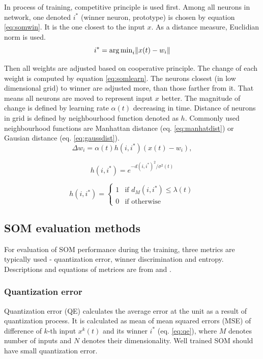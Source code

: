 In process of training, competitive principle is used first. Among all neurons in network, one denoted $i^*$ (winner neuron, prototype) is chosen by equation \ref{eq:somwin}. It is the one closest to the input $x$. As a distance measure, Euclidian norm is used.
\begin{equation}
	\label{eq:somwin}
	i^* = {\operatorname*{arg\,min}}_i \|{x}(t)-{w}_i\|
\end{equation}

Then all weights are adjusted based on cooperative principle. The change of each weight is computed by equation \ref{eq:somlearn}. The neurons closest (in low dimensional grid) to winner are adjusted more, than those farther from it. That means all neurons are moved to  represent input $x$ better. The magnitude of change is defined by learning rate $\alpha(t)$ decreasing in time. Distance of neurons in grid is defined by neighbourhood function denoted as $h$. Commonly used neighbourhood functions are Manhattan distance (eq. \ref{eq:manhatdist}) or Gausian distance (eq. \ref{eq:gaussdist}). 
\begin{equation}
	\label{eq:somlearn}
	\Delta{w}_i = \alpha(t) h(i,i^*) ({x}(t)-{w}_i),
\end{equation}


\begin{equation}
	\label{eq:gaussdist}
	h(i,i^*) = e^{-d(i,i^*)^2/{\sigma}^2(t)}
\end{equation}

\begin{equation}
	\label{eq:manhatdist}
	h(i,i^*) = \begin{cases}
		1  & \mbox{if } d_M(i,i^*)\le{\lambda}(t) \\
		0  & \mbox{if } \text{otherwise}%
	\end{cases}
\end{equation}

\subsection{SOM evaluation methods}
For evaluation of SOM performance during the training, three metrics are typically used - quantization error, winner discrimination and entropy. Descriptions and equations of metrices are from \cite{rebrova2013} and \cite{vanco2010-som}.

\subsubsection{Quantization error}
Quantization error (QE) calculates the average error at the unit as a result of quantization process. It is calculated as mean of mean squared errors (MSE) of difference of $k$-th input $x^k(t)$ and its winner $i^*$ (eq. \ref{eq:qe}), where $M$ denotes number of inputs and $N$ denotes their dimensionality. Well trained SOM should have small quantization error.

